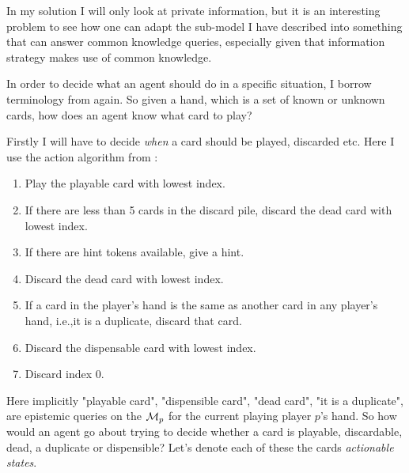 In my solution I will only look at private information, but it is an interesting problem to see how one can adapt the sub-\KTfourfiveN model I have described into something that can answer common knowledge queries, especially given that \cite{CoxEtAl2015} information strategy makes use of common knowledge.

In order to decide what an agent should do in a specific situation, I borrow terminology from \cite{CoxEtAl2015} again. So given a hand, which is a set of known or unknown cards, how does an agent know what card to play?





Firstly I will have to decide \emph{when} a card should be played, discarded etc. Here I use the action algorithm from \cite{CoxEtAl2015}:
\begin{enumerate}
	\item Play the playable card with lowest index.
	\item If there are less than 5 cards in the discard pile, discard the dead card with lowest index.
	\item If there are hint tokens available, give a hint.
	\item Discard the dead card with lowest index.
	\item If a card in the player’s hand is the same as another card in any player’s hand, i.e.,it is a duplicate, discard that card.
	\item Discard the dispensable card with lowest index.
	\item Discard index 0.
\end{enumerate}

Here implicitly "playable card", "dispensible card", "dead card", "it is a duplicate", are epistemic queries on the $\mathcal{M}_p$ for the current playing player $p$'s hand. So how would an agent go about trying to decide whether a card is playable, discardable, dead, a duplicate or dispensible? Let's denote each of these the cards \emph{actionable states}.

